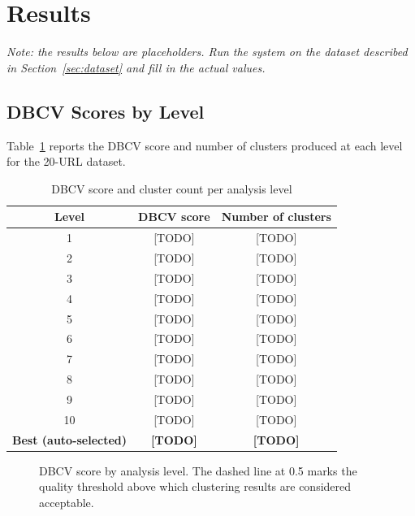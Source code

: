 \section{Results}
\label{sec:results}

\textit{Note: the results below are placeholders. Run the system on the dataset described in Section~\ref{sec:dataset} and fill in the actual values.}

\subsection{DBCV Scores by Level}
\label{subsec:dbcv-results}

Table~\ref{tab:dbcv-by-level} reports the DBCV score and number of clusters produced at each level for the 20-URL dataset.

\begin{table}[htbp]
\centering
\caption{DBCV score and cluster count per analysis level}
\label{tab:dbcv-by-level}
\begin{tabular}{ccc}
\toprule
\textbf{Level} & \textbf{DBCV score} & \textbf{Number of clusters} \\
\midrule
1  & [TODO] & [TODO] \\
2  & [TODO] & [TODO] \\
3  & [TODO] & [TODO] \\
4  & [TODO] & [TODO] \\
5  & [TODO] & [TODO] \\
6  & [TODO] & [TODO] \\
7  & [TODO] & [TODO] \\
8  & [TODO] & [TODO] \\
9  & [TODO] & [TODO] \\
10 & [TODO] & [TODO] \\
\midrule
\textbf{Best (auto-selected)} & \textbf{[TODO]} & \textbf{[TODO]} \\
\bottomrule
\end{tabular}
\end{table}

\begin{figure}[htbp]
    \centering
    \caption{DBCV score by analysis level. The dashed line at 0.5 marks the quality threshold above which clustering results are considered acceptable.}
    \label{fig:dbcv-by-level}
\end{figure}

